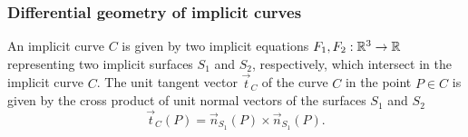\subsubsection {Differential geometry of implicit curves}

An implicit curve $C$ is
given by two implicit equations $F_1, F_2: \mathbb{R}^3 \to \mathbb{R}$ representing two implicit
surfaces $S_1$ and $S_2$, respectively, which intersect in the implicit 
curve $C$. The unit tangent vector $\vec{t}_C$  
of the curve $C$ in the point $P \in C$ is given by the cross product of 
unit normal vectors of the surfaces $S_1$ and $S_2$
$$\vec{t}_C(P) = \vec{n}_{S_1}(P) \times \vec{n}_{S_1}(P).$$

